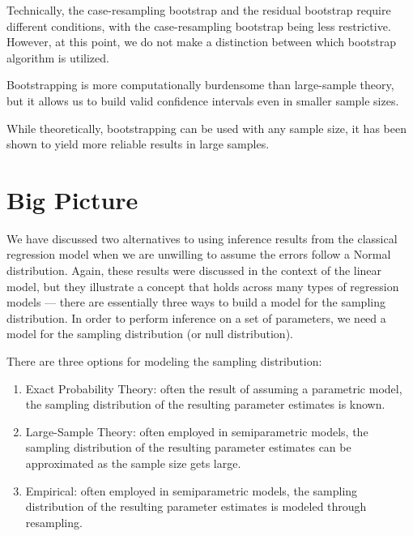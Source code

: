 \documentclass[
]{book}
\providecommand{\tightlist}{%
  \setlength{\itemsep}{0pt}\setlength{\parskip}{0pt}}
\theoremstyle{plain}
\theoremstyle{mydefn}
\theoremstyle{myexmpl}
\theoremstyle{remark}
\begin{document}
\begin{rmdtip}
Technically, the case-resampling bootstrap and the residual bootstrap require different conditions, with the case-resampling bootstrap being less restrictive. However, at this point, we do not make a distinction between which bootstrap algorithm is utilized.
\end{rmdtip}

Bootstrapping is more computationally burdensome than large-sample theory, but it allows us to build valid confidence intervals even in smaller sample sizes.

\begin{rmdtip}
While theoretically, bootstrapping can be used with any sample size, it has been shown to yield more reliable results in large samples.
\end{rmdtip}

\hypertarget{big-picture}{%
\section{Big Picture}\label{big-picture}}

We have discussed two alternatives to using inference results from the classical regression model when we are unwilling to assume the errors follow a Normal distribution. Again, these results were discussed in the context of the linear model, but they illustrate a concept that holds across many types of regression models --- there are essentially three ways to build a model for the sampling distribution. In order to perform inference on a set of parameters, we need a model for the sampling distribution (or null distribution).

\begin{rmdkeyidea}
There are three options for modeling the sampling distribution:

\begin{enumerate}
\def\labelenumi{\arabic{enumi}.}
\tightlist
\item
  Exact Probability Theory: often the result of assuming a parametric model, the sampling distribution of the resulting parameter estimates is known.
\item
  Large-Sample Theory: often employed in semiparametric models, the sampling distribution of the resulting parameter estimates can be approximated as the sample size gets large.
\item
  Empirical: often employed in semiparametric models, the sampling distribution of the resulting parameter estimates is modeled through resampling.
\end{enumerate}
\end{rmdkeyidea}
\end{document}
